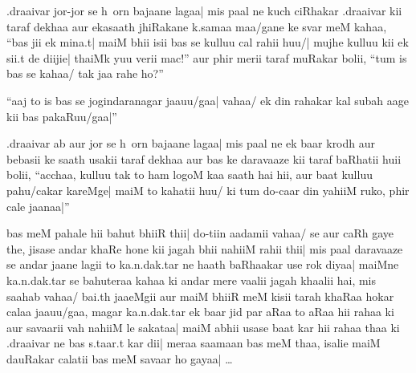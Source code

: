 \documentclass[11pt]{article}
\begin{document}
.draaivar jor-jor se h~orn bajaane lagaa| mis paal ne kuch ciRhakar
.draaivar kii taraf dekhaa aur ekasaath jhiRakane k.samaa maa/gane
ke svar meM kahaa, ``bas jii ek mina.t| maiM bhii isii bas se kulluu
cal rahii huu/| mujhe kulluu kii ek sii.t de diijie| thaiMk yuu verii
mac!'' aur phir merii taraf muRakar bolii, ``tum is bas se kahaa/ tak
jaa rahe ho?''

``aaj to is bas se jogindaranagar jaauu/gaa| vahaa/ ek din rahakar kal
subah aage kii bas pakaRuu/gaa|''

.draaivar ab aur jor se h~orn bajaane lagaa| mis paal ne ek baar krodh
aur bebasii ke saath usakii taraf dekhaa aur bas ke daravaaze kii
taraf baRhatii huii bolii, ``acchaa, kulluu tak to ham logoM kaa saath
hai hii, aur baat kulluu pahu/cakar kareMge| maiM to kahatii huu/ ki
tum do-caar din yahiiM ruko, phir cale jaanaa|''

bas meM pahale hii bahut bhiiR thii| do-tiin aadamii vahaa/ se aur caRh
gaye the, jisase andar khaRe hone kii jagah bhii nahiiM rahii thii|
mis paal daravaaze se andar jaane lagii to ka.n.dak.tar ne haath
baRhaakar use rok diyaa| maiMne ka.n.dak.tar se bahuteraa kahaa ki
andar mere vaalii jagah khaalii hai, mis saahab vahaa/ bai.th
jaaeMgii aur maiM bhiiR meM kisii tarah khaRaa hokar calaa jaauu/gaa,
magar ka.n.dak.tar ek baar jid par aRaa to aRaa hii rahaa ki aur
savaarii vah nahiiM le sakataa| maiM abhii usase baat kar hii rahaa
thaa ki .draaivar ne bas s.taar.t kar dii| meraa saamaan bas meM thaa,
isalie maiM dauRakar calatii bas meM savaar ho gayaa| {\rm\ldots{}}\par
\end{document}
